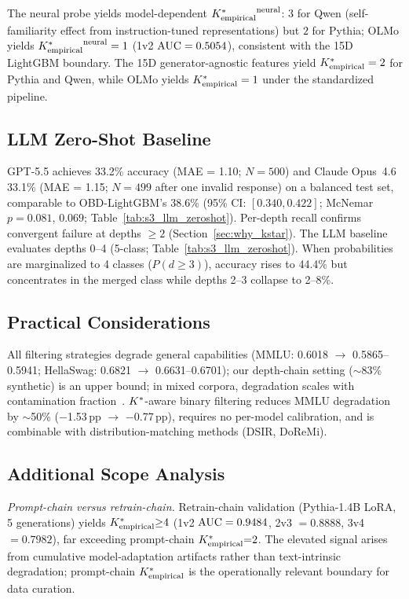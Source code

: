 The neural probe yields model-dependent ${K^*_{\text{empirical}}}^{\text{neural}}$: $3$ for Qwen (self-familiarity effect from instruction-tuned representations) but $2$ for Pythia; OLMo yields ${K^*_{\text{empirical}}}^{\text{neural}} = 1$ (1v2 $\text{AUC} = 0.5054$), consistent with the 15D LightGBM boundary.
The 15D generator-agnostic features yield ${K^*_{\text{empirical}}} = 2$ for Pythia and Qwen, while OLMo yields ${K^*_{\text{empirical}}} = 1$ under the standardized pipeline.

\subsection{LLM Zero-Shot Baseline}
\label{sec:extended_llm}

GPT-5.5 achieves 33.2\% accuracy (MAE = 1.10; $N{=}500$) and Claude Opus~4.6 33.1\% (MAE = 1.15; $N{=}499$ after one invalid response) on a balanced test set, comparable to OBD-LightGBM's 38.6\% (95\% CI: $[0.340, 0.422]$; McNemar $p = 0.081$, $0.069$; Table~\ref{tab:s3_llm_zeroshot}).
Per-depth recall confirms convergent failure at depths $\geq 2$ (Section~\ref{sec:why_kstar}).
The LLM baseline evaluates depths 0--4 (5-class; Table~\ref{tab:s3_llm_zeroshot}). When probabilities are marginalized to 4 classes ($P(d{\geq}3)$), accuracy rises to 44.4\% but concentrates in the merged class while depths 2--3 collapse to 2--8\%.

\subsection{Practical Considerations}

All filtering strategies degrade general capabilities (MMLU: 0.6018 $\to$ 0.5865--0.5941; HellaSwag: 0.6821 $\to$ 0.6631--0.6701); our depth-chain setting (${\sim}$83\% synthetic) is an upper bound; in mixed corpora, degradation scales with contamination fraction~\cite{shumailov2024collapse, dohmatob2024model}.
${K^*}$-aware binary filtering reduces MMLU degradation by ${\sim}$50\% ($-$1.53\,pp $\to$ $-$0.77\,pp), requires no per-model calibration, and is combinable with distribution-matching methods (DSIR, DoReMi).

\subsection{Additional Scope Analysis}
\label{sec:extended_limitations}

\emph{Prompt-chain versus retrain-chain.}
Retrain-chain validation (Pythia-1.4B LoRA, 5 generations) yields ${K^*_{\text{empirical}}}{\geq}4$ (1v2 $\text{AUC} = 0.9484$, 2v3 $= 0.8888$, 3v4 $= 0.7982$), far exceeding prompt-chain ${K^*_{\text{empirical}}}{=}2$.
The elevated signal arises from cumulative model-adaptation artifacts rather than text-intrinsic degradation; prompt-chain ${K^*_{\text{empirical}}}$ is the operationally relevant boundary for data curation.

